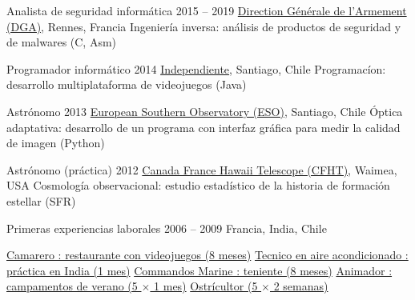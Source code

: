 \begin{joblist}[12.8][8.4][4]

\setlength{\parskip}{0.3cm}
\vspace{-0.4cm}

\item[Analista de seguridad informática]{2015 -- 2019}
	{
  \href{http://www.defense.gouv.fr/dga/}{Direction Générale de l'Armement (DGA)}, Rennes, Francia
	}
  {Ingeniería inversa: análisis de productos de seguridad y de malwares (C, Asm)}


\item[Programador informático]{2014}
	{
	\href{https://tinmarino.github.io/Page/}{Independiente}, Santiago, Chile
	}
	{Programacíon: desarrollo multiplataforma de videojuegos (Java)}



\item[Astrónomo]{2013}
	{
	\href{http://www.eso.org/public/}{European Southern Observatory (ESO)}, Santiago, Chile
	}
  {Óptica adaptativa: desarrollo de un programa con interfaz gráfica para medir la calidad de imagen (Python)}

\item[Astrónomo (práctica)]{2012}
	{
\href{https://www.cfht.hawaii.edu/}{Canada France Hawaii Telescope (CFHT)}, Waimea, USA
  }
  {Cosmología observacional: estudio estadístico de la historia de formación estellar (SFR)}
	
\item[Primeras experiencias laborales]{2006 -- 2009}
	{
	Francia, India, Chile
	}
	{
    \renewcommand\labelitemi{{}}
		\vspace{-0.8cm}
    \setlength{\parskip}{0cm}
		\begin{itemize}
		\setlength\itemsep{0cm}

    \cvitem \href{http://www.insertcoin.cl/}{ Camarero : restaurante con videojuegos (8 meses)}
    \cvitem \href{http://www.dupont.co.in/}{ Tecnico en aire acondicionado : práctica en India (1 mes)}
    \cvitem \href{http://www.defense.gouv.fr/marine/organisation/forces/fusiliers-marins-et-commandos/force-maritime-des-fusiliers-marins-et-commandos}{ Commandos Marine : teniente (8 meses)}
    \cvitem \href{http://www.vacances-pour-tous.org/}{ Animador : campamentos de verano (5 $\times$ 1 mes)}
    \cvitem \href{http://huitresdesaintvaast.fr/}{ Ostrícultor (5 $\times$ 2 semanas)}
		\end{itemize}
  }

	
\end{joblist}


